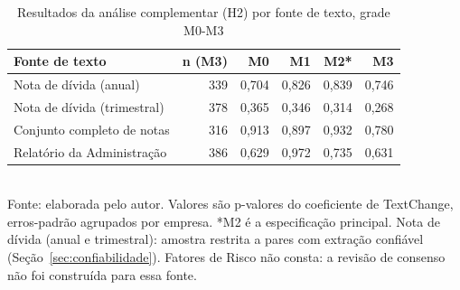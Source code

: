 \documentclass[a4paper,12pt]{report}
\begin{document}
\begin{table}[htbp]
    \centering
    \caption{Resultados da análise complementar (H2) por fonte de texto, grade M0-M3}
    \label{tab:h2}
    \small
    \begin{tabular}{@{}lrrrrr@{}}
        \toprule
        \textbf{Fonte de texto} & \textbf{n (M3)} & \textbf{M0} & \textbf{M1} & \textbf{M2*} & \textbf{M3} \\
        \midrule
        Nota de dívida (anual)       & 339 & 0,704 & 0,826 & 0,839 & 0,746 \\
        Nota de dívida (trimestral)  & 378 & 0,365 & 0,346 & 0,314 & 0,268 \\
        Conjunto completo de notas   & 316 & 0,913 & 0,897 & 0,932 & 0,780 \\
        Relatório da Administração   & 386 & 0,629 & 0,972 & 0,735 & 0,631 \\
        \bottomrule
    \end{tabular}
    \\[0.3cm]
    {\footnotesize Fonte: elaborada pelo autor. Valores são p-valores do coeficiente de TextChange, erros-padrão agrupados por empresa. *M2 é a especificação principal. Nota de dívida (anual e trimestral): amostra restrita a pares com extração confiável (Seção~\ref{sec:confiabilidade}). Fatores de Risco não consta: a revisão de consenso não foi construída para essa fonte.}
\end{table}
\end{document}

